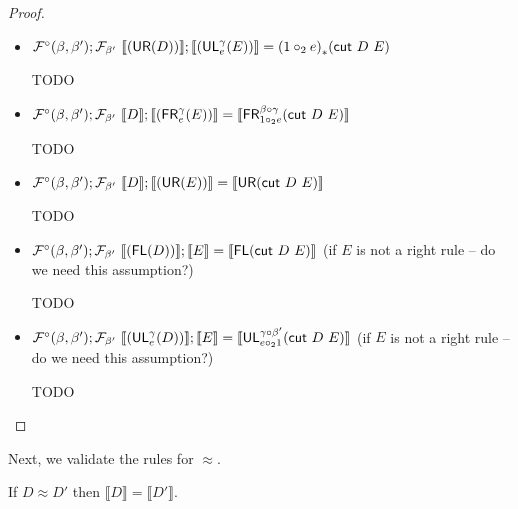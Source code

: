 \documentclass{drl-common/llncs}
\renewcommand{\sem}[1]{\ensuremath{ \llbracket #1 \rrbracket}}
\newcommand\compo[2]{\ensuremath{#1 \circ #2}}
\newcommand\comph[2]{\ensuremath{#1 \mathbin{\circ_2} #2}}
\newcommand\tr[2]{\ensuremath{{{#1}_{*}(#2)}}}
\newcommand\cut[2]{\ensuremath{{\dsd{cut} \,\, #1 \,\, #2}}}
\newcommand\UL[3]{\ensuremath{\dsd{UL}^{#1}_{#2}(#3)}}
\newcommand\FR[3]{\ensuremath{\dsd{FR}^{#1}_{#2}(#3)}}
\newcommand\FL[1]{\ensuremath{\dsd{FL}(#1)}}
\newcommand\UR[1]{\ensuremath{\dsd{UR}(#1)}}
\newcommand\ap[2]{\ensuremath{#1 \approx #2}}
\begin{document}
\begin{proof}
\begin{itemize}
\item $\semofcut {(\UR D)} {(\UL \gamma e E)} = \tr {(\comph{1}{e})} {\cut D E}$

TODO

\item $\semofcut D {(\FR \gamma e E)} = \sem{\FR {\compo{\beta}{\gamma}} {\comph{1}{e}} {\cut D E}}$

TODO

\item $\semofcut D {(\UR E)} = \sem{\UR {\cut D E}}$

TODO

\item $\semofcut {(\FL D)} E = \sem{\FL {\cut D E}}$ (if $E$ is not a
  right rule -- do we need this assumption?)

TODO

\item $\semofcut {(\UL \gamma e D)} E = \sem{\UL {\compo{\gamma}{\beta'}}
  {\comph{e}{1}} {\cut D E}}$ (if $E$ is not a right rule -- do we need
  this assumption?)

TODO
\end{itemize}
\end{proof}

Next, we validate the rules for \ap{}{}.  

\begin{theorem} If \ap{D}{D'} then $\sem{D} = \sem{D'}$.  
\end{theorem}
\end{document}
